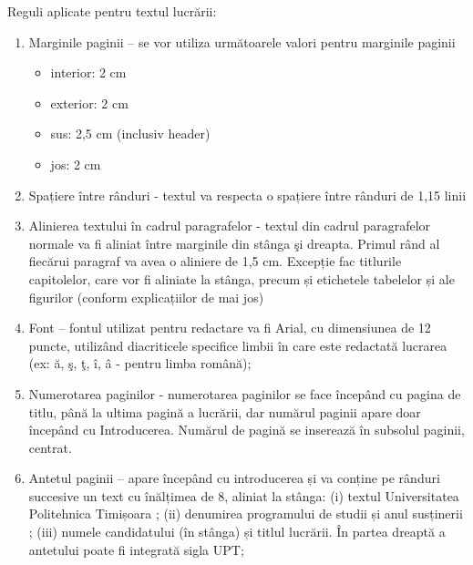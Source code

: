 Reguli aplicate pentru textul lucrării:
\begin{enumerate}[leftmargin=2cm,topsep=1.15pt,itemsep=1.15pt,partopsep=1.15pt,parsep=1.15pt,label=\alph*.]
   \item Marginile paginii – se vor utiliza următoarele valori pentru marginile paginii
   \begin{itemize}[topsep=1.15pt,itemsep=1.15pt,partopsep=1.15pt,parsep=1.15pt]
     \item interior: 2 cm 
     \item exterior: 2 cm 
     \item sus: 2,5 cm (inclusiv header)
     \item jos: 2 cm
   \end{itemize}
   \item Spațiere între rânduri - textul va respecta o spațiere între rânduri de 1,15 linii
   \item Alinierea textului în cadrul paragrafelor - textul din cadrul paragrafelor normale va fi aliniat între marginile din stânga şi dreapta. Primul rând al fiecărui paragraf va avea o aliniere de 1,5 cm. Excepție fac titlurile capitolelor, care vor fi aliniate la stânga, precum și etichetele tabelelor și ale figurilor (conform explicațiilor de mai jos)
   \item Font – fontul utilizat pentru redactare va fi Arial, cu dimensiunea de 12 puncte, utilizând diacriticele specifice limbii în care este redactată lucrarea (ex: ă, ş, ţ, î, â - pentru limba română);
   \item Numerotarea paginilor - numerotarea paginilor se face începând cu pagina de titlu, până la ultima pagină a lucrării, dar numărul paginii apare doar începând cu Introducerea. Numărul de pagină se inserează în subsolul paginii, centrat.
   \item Antetul paginii – apare începând cu introducerea și va conține pe rânduri succesive un text cu înălțimea de 8, aliniat la stânga: (i) textul Universitatea Politehnica Timișoara ; (ii) denumirea programului de studii și anul susținerii ; (iii) numele candidatului (în stânga) și titlul lucrării. În partea dreaptă a antetului poate fi integrată sigla UPT;
\end{enumerate}